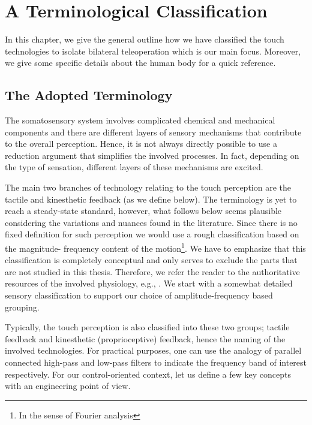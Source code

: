 \chapter{A Terminological Classification}
\label{chap:apdxphysio}

In this chapter, we give the general outline how we have classified the touch technologies to isolate bilateral teleoperation which is 
our main focus. Moreover, we give some specific details about the human body for a quick reference.


\section{The Adopted Terminology}

The somatosensory system involves complicated chemical and mechanical components and there are different layers of sensory mechanisms 
that contribute to the overall perception. Hence, it is not always directly possible to use a reduction argument that simplifies the 
involved processes. In fact, depending on the type of sensation, different layers of these mechanisms are excited.

The main two branches of technology relating to the touch perception are the tactile and kinesthetic feedback (as we define below). The 
terminology is yet to reach a steady-state standard, however, what follows below seems plausible considering the variations and nuances found 
in the literature. Since there is no fixed definition for such perception we would use a rough  classification based on the magnitude-%
frequency content of the motion\footnote{In the sense of Fourier analysis}. We have to emphasize that this classification is completely 
conceptual and only serves to exclude the parts that are not studied in this thesis. Therefore, we refer the reader to the authoritative 
resources of the involved physiology, e.g., \cite{kandel}. We start with a somewhat detailed sensory classification to support our choice 
of amplitude-frequency based grouping.

Typically, the touch perception is also classified into these two groups; tactile feedback and kinesthetic (proprioceptive) feedback, 
hence the naming of the involved technologies. For practical purposes, one can use the analogy of parallel connected high-pass and low-pass 
filters to indicate the frequency band of interest respectively. For our control-oriented context, let us define a few key concepts with 
an engineering point of view. 

